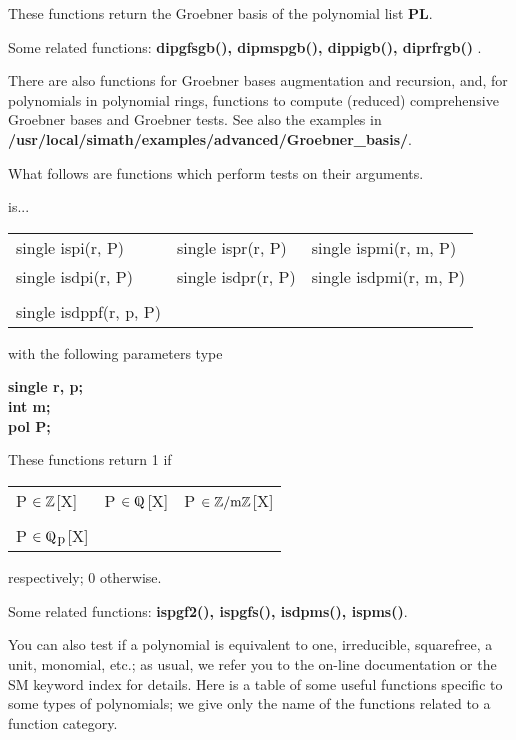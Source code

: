 These functions return the Groebner basis of the polynomial list {\bf PL}.

Some related functions:\hspace*{0.7em}
{\bf  dipgfsgb(), dipmspgb(), dippigb(), diprfrgb() }.

\leer\leer
There are also functions for Groebner bases augmentation and recursion, and,
for polynomials in polynomial rings, functions to compute (reduced) comprehensive
Groebner bases and Groebner tests. See also the examples in  \\
{\bf /usr/local/simath/examples/advanced/Groebner\_basis/}.

\newpage

What follows are functions which perform tests on their arguments.

\begin{center} is... \end{center}
\begin{center}
{\bf
\begin{tabular}{lll}
single ispi(r, P)  & single ispr(r, P)  & single ispmi(r, m, P)\\
single isdpi(r, P) & single isdpr(r, P) & single isdpmi(r, m, P)\\
&&\\
single isdppf(r, p, P) &&\\ 
\end{tabular} }
\end{center}
\parbox[t]{2.5in}{with the following parameters type}
\parbox[t]{3.0in}{\bf single r, p;\\
                      int m;\\
                      pol P;}

These functions return 1 if
\begin{center}
{\bf
\begin{tabular}{lll}
P $\in \mbox{$\mathbb Z$}$[X] & P $\in \Qfett$[X] & P $\in \mbox{$\mathbb Z$}/\mbox{m}\mbox{$\mathbb Z$}$[X]\\
&&\\
P $\in \Qfett_{\mbox{p}}$[X] &&\\
\end{tabular} }
\end{center}
respectively; 0 otherwise.

Some related functions:\hspace*{0.7em}
{\bf  ispgf2(), ispgfs(), isdpms(), ispms()}.

\leer\leer
You can also test if a polynomial is equivalent to one, irreducible,
squarefree, a unit, monomial, etc.; as usual, we refer you to the on-line
documentation or the SM keyword index for details. Here is a table of some 
useful functions specific to some types of polynomials; we give only the name 
of the functions related to a function category.

